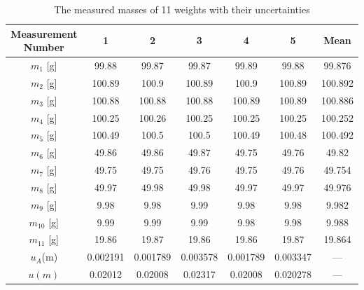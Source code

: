 \documentclass[a4paper,12pt,titlepage,bibliography=numbered]{article}
\begin{document}
\begin{table}[H]
\centering
\caption{The measured masses of 11 weights with their uncertainties} \label{table_wth_weights}
\begin{tabular}{|c|c|c|c|c|c|c|}
\hline
Measurement Number & 1 & 2 & 3 & 4 & 5 & Mean \\ 
\hline
$m_1$ [g] & 99.88 & 99.87 & 99.87 & 99.89 & 99.88 & 99.876 \\ 
\hline
$m_2$ [g] & 100.89 & 100.9 & 100.89 & 100.9 & 100.89 & 100.892 \\ 
\hline
$m_3$ [g] & 100.88 & 100.88 & 100.88 & 100.89 & 100.89 & 100.886 \\ 
\hline
$m_4$ [g] & 100.25 & 100.26 & 100.25 & 100.25 & 100.25 & 100.252 \\ 
\hline
$m_5$ [g] & 100.49 & 100.5 & 100.5 & 100.49 & 100.48 & 100.492 \\ 
\hline
$m_6$ [g] & 49.86 & 49.86 & 49.87 & 49.75 & 49.76 & 49.82 \\
\hline
$m_7$ [g] & 49.75 & 49.75 & 49.76 & 49.75 & 49.76 & 49.754 \\ 
\hline
$m_8$ [g] & 49.97 & 49.98 & 49.98 & 49.97 & 49.97 & 49.976 \\ 
\hline
$m_9$ [g] & 9.98 & 9.98 & 9.99 & 9.98 & 9.98 & 9.982 \\
\hline
$m_{10}$ [g] & 9.99 & 9.99 & 9.99 & 9.98 & 9.98 & 9.988 \\ 
\hline
$m_{11}$ [g] & 19.86 & 19.87 & 19.86 & 19.86 & 19.87 & 19.864 \\ 
\hline
$u_A$(m) & 0.002191 & 0.001789 & 0.003578 & 0.001789 & 0.003347 & --- \\ 
\hline
$u(m)$ & 0.02012 & 0.02008 & 0.02317 & 0.02008 & 0.020278 & --- \\ 
\hline
\end{tabular}
\end{table}
\end{document}
